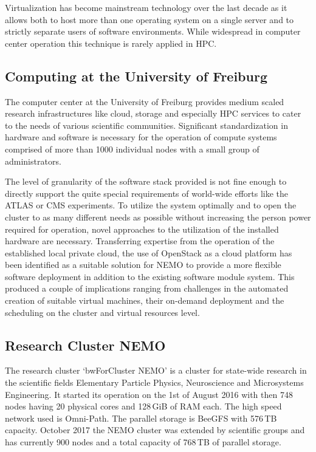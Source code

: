 Virtualization has become mainstream technology over the last decade as it allows
both to host more than one operating system on a single server and to strictly
separate users of software environments. While widespread in computer center
operation this technique is rarely applied in HPC.

\subsection{Computing at the University of Freiburg}

The computer center at the University of Freiburg provides
medium scaled research
infrastructures like cloud, storage and especially HPC services to cater to the
needs of various scientific communities. Significant standardization
in hardware and software is necessary for the operation of compute systems comprised of
more than 1000 individual nodes with a small group of administrators.

The level of granularity of the software stack provided is not fine enough to
directly support the quite special requirements of world-wide efforts like the
ATLAS or CMS experiments.
To utilize the system
optimally and to open the cluster to as many different needs as
possible without increasing the person power required for operation, novel approaches to the
utilization of the installed hardware are necessary.
Transferring expertise from the operation of the established local private cloud,
the use of OpenStack as a cloud platform has been identified as a
suitable solution for NEMO to provide a more flexible software
deployment in addition to the existing software module system.
This produced a couple of
implications ranging from challenges in the automated creation of suitable
virtual machines, their on-demand deployment and the scheduling on the cluster
and virtual resources level.

\subsection{Research Cluster NEMO}

The research cluster \lq{}bwForCluster NEMO\rq{} is a cluster for state-wide
research in the scientific fields Elementary Particle Physics, Neuroscience and
Microsystems Engineering. It started its operation on the 1st of August 2016
with then 748 nodes having 20 physical cores and 128\,GiB of RAM each. The
high speed network used is Omni-Path. The parallel storage is BeeGFS with
576\,TB capacity.
October 2017 the NEMO cluster was extended by scientific groups and has
currently 900 nodes and a total capacity of 768\,TB of parallel storage.

